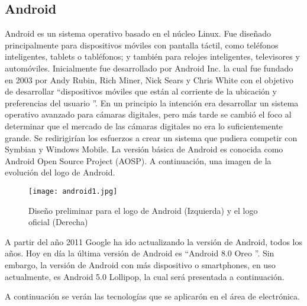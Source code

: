 \subsection{Android}

\par
Android es un sistema operativo basado en el núcleo Linux. Fue diseñado principalmente para dispositivos móviles con pantalla táctil, como teléfonos inteligentes, tablets o tabléfonos; y también para relojes inteligentes, televisores y automóviles. Inicialmente fue desarrollado por Android Inc. la cual fue fundado en 2003 por Andy Rubin, Rich Miner, Nick Sears y Chris White con el objetivo de desarrollar \textquotedblleft dispositivos móviles que están al corriente de la ubicación y preferencias del usuario \textquotedblright\cite{android-wiki}. En un principio la intención era desarrollar un sistema operativo avanzado para cámaras digitales, pero más tarde se cambió el foco al determinar que el mercado de las cámaras digitales no era lo suficientemente grande. Se redirigirían los esfuerzos a crear un sistema que pudiera competir con Symbian y Windows Mobile\cite{android-xataka}. La versión básica de Android es conocida como Android Open Source Project (AOSP)\cite{android-wiki}. A continuación, una imagen de la evolución del logo de Android. 

\begin{figure}[H]
	\texttt{[image: android1.jpg]}
	\caption{Diseño preliminar para el logo de Android (Izquierda) y el logo oficial (Derecha)}
\end{figure}

\par \noindent
A partir del año 2011 Google ha ido actualizando la versión de Android, todos los años. Hoy en día la última versión de Android es \textquotedblleft Android 8.0 Oreo \textquotedblright. Sin embargo, la versión de Android con más dispositivo o smartphones, en uso actualmente, es Android 5.0 Lollipop, la cual será presentada a continuación.

\par \noindent
A continuación se verán las tecnologías que se aplicarón en el área de electrónica.